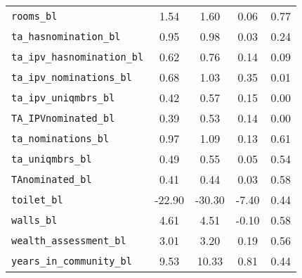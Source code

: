 \begin{longtable}{lcccc}
\texttt{rooms\_bl} & 1.54 & 1.60 & 0.06 & 0.77\\
\texttt{ta\_hasnomination\_bl} & 0.95 & 0.98 & 0.03 & 0.24\\
\texttt{ta\_ipv\_hasnomination\_bl} & 0.62 & 0.76 & 0.14 & 0.09\\
\addlinespace
\texttt{ta\_ipv\_nominations\_bl} & 0.68 & 1.03 & 0.35 & 0.01\\
\texttt{ta\_ipv\_uniqmbrs\_bl} & 0.42 & 0.57 & 0.15 & 0.00\\
\texttt{TA\_IPVnominated\_bl} & 0.39 & 0.53 & 0.14 & 0.00\\
\texttt{ta\_nominations\_bl} & 0.97 & 1.09 & 0.13 & 0.61\\
\texttt{ta\_uniqmbrs\_bl} & 0.49 & 0.55 & 0.05 & 0.54\\
\addlinespace
\texttt{TAnominated\_bl} & 0.41 & 0.44 & 0.03 & 0.58\\
\texttt{toilet\_bl} & -22.90 & -30.30 & -7.40 & 0.44\\
\texttt{walls\_bl} & 4.61 & 4.51 & -0.10 & 0.58\\
\texttt{wealth\_assessment\_bl} & 3.01 & 3.20 & 0.19 & 0.56\\
\texttt{years\_in\_community\_bl} & 9.53 & 10.33 & 0.81 & 0.44\\*
\end{longtable}

